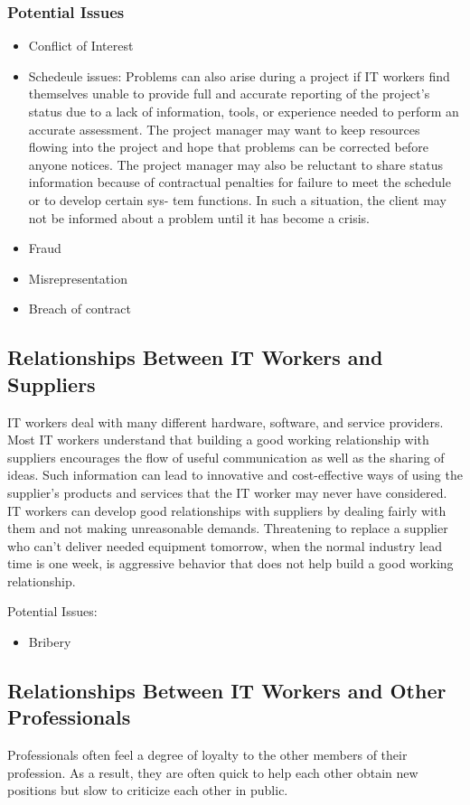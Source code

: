 \documentclass[11pt]{article}
\begin{document}
\subsubsection{Potential Issues}
\label{sec:org26a17d2}
\begin{itemize}
\item Conflict of Interest
\item Schedeule issues: Problems can also arise during a project if IT workers find themselves unable to provide full and accurate reporting of the project’s status due to a lack of information, tools, or experience needed to perform an accurate assessment. The project manager may want to keep resources flowing into the project and hope that problems can be corrected before anyone notices. The project manager may also be reluctant to share status information because of contractual penalties for failure to meet the schedule or to develop certain sys- tem functions. In such a situation, the client may not be informed about a problem until it has become a crisis.
\item Fraud
\item Misrepresentation
\item Breach of contract
\end{itemize}
\subsection{Relationships Between IT Workers and Suppliers}
\label{sec:org954db97}
IT workers deal with many different hardware, software, and service providers. Most IT workers understand that building a good working relationship with suppliers encourages the flow of useful communication as well as the sharing of ideas. Such information can lead to innovative and cost-effective ways of using the supplier’s products and services that the IT worker may never have considered.
IT workers can develop good relationships with suppliers by dealing fairly with them and not making unreasonable demands. Threatening to replace a supplier who can’t deliver needed equipment tomorrow, when the normal industry lead time is one week, is aggressive behavior that does not help build a good working relationship.

Potential Issues:
\begin{itemize}
\item Bribery
\end{itemize}
\subsection{Relationships Between IT Workers and Other Professionals}
\label{sec:org8023049}
Professionals often feel a degree of loyalty to the other members of their profession. As a result, they are often quick to help each other obtain new positions but slow to criticize each other in public.
\end{document}
